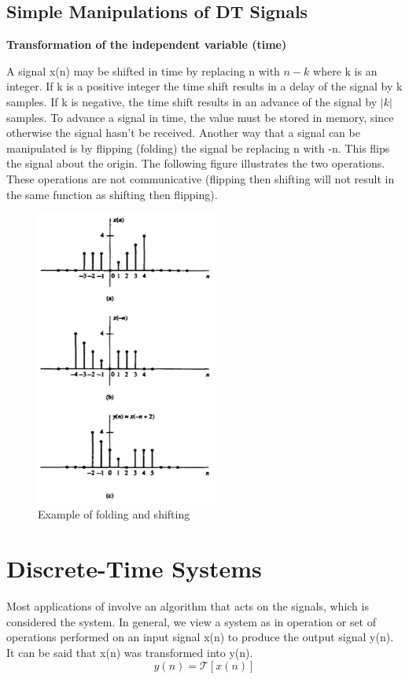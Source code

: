 \documentclass{article} %
\begin{document}
	\subsection{Simple Manipulations of DT Signals}
	\textbf{Transformation of the independent variable (time)}
	
	A signal x(n) may be shifted in time by replacing n with $n-k$ where k is an integer. If k is a positive integer the time shift results in a delay of the signal by k samples. If k is negative, the time shift results in an advance of the signal by $|k|$ samples. To advance a signal in time, the value must be stored in memory, since otherwise the signal hasn't be received. Another way that a signal can be manipulated is by flipping (folding) the signal be replacing n with -n. This flips the signal about the origin. The following figure illustrates the two operations. These operations are not communicative (flipping then shifting will not result in the same function as shifting then flipping). 
	\begin{figure}[h]
    \centering
	\includegraphics[width=6cm]{manip}
	\caption{Example of folding and shifting}
	\end{figure}
	
	\section{Discrete-Time Systems}
	
	Most applications of involve an algorithm that acts on the signals, which is considered the system. In general, we view a system as in operation or set of operations performed on an input signal x(n) to produce the output signal y(n). It can be said that x(n) was transformed into y(n).
	\begin{equation}
 	 y(n) = \mathcal{T}[x(n)]
	\end{equation}
	 
\end{document}

